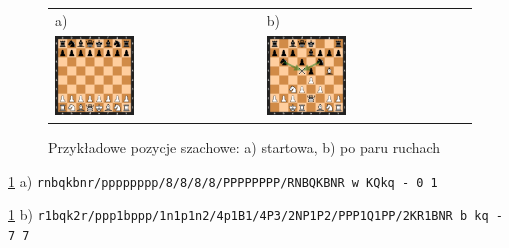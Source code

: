 \begin{figure}[ht]
    \centering
    \begin{tabular}{@{}ll@{}}
        a) & b) \\
        \includegraphics[width=0.4\textwidth]{rozdzialy/rozdzial01/1_komunikacja-z-systemem/rysunki/pozycja_startowa}
        &
        \includegraphics[width=0.4\textwidth]{rozdzialy/rozdzial01/1_komunikacja-z-systemem/rysunki/pozycja_niejasna}
    \end{tabular}
    \caption{Przykładowe pozycje szachowe: a) startowa, b) po paru ruchach}
    \label{fig: basic_chess_positions}
\end{figure}

\centerline{
    \ref{fig: basic_chess_positions} a) \lstset{basicstyle=\ttfamily}\lstinline{rnbqkbnr/pppppppp/8/8/8/8/PPPPPPPP/RNBQKBNR w KQkq - 0 1}
}
\centerline{
    \ref{fig: basic_chess_positions} b) \lstset{basicstyle=\ttfamily}\lstinline{r1bqk2r/ppp1bppp/1n1p1n2/4p1B1/4P3/2NP1P2/PPP1Q1PP/2KR1BNR b kq - 7 7}
}

